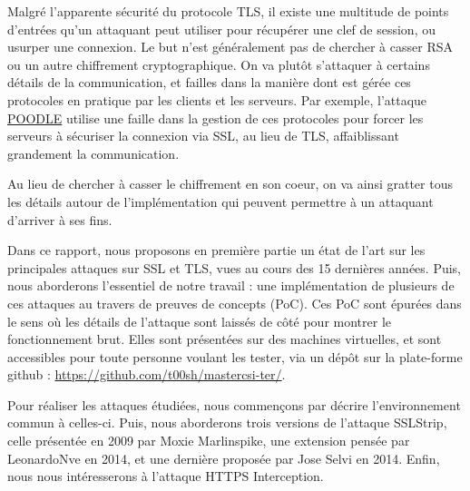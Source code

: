 Malgré l'apparente sécurité du protocole TLS, il existe une multitude de points d'entrées qu'un attaquant peut utiliser pour récupérer une clef de session, ou usurper une connexion. Le but n'est généralement pas de chercher à casser RSA ou un autre chiffrement cryptographique. On va plutôt s'attaquer à certains détails de la communication, et failles dans la manière dont est gérée ces protocoles en pratique par les clients et les serveurs. Par exemple, l'attaque \hyperref[sec:poodle]{POODLE} utilise une faille dans la gestion de ces protocoles pour forcer les serveurs à sécuriser la connexion via SSL, au lieu de TLS, affaiblissant grandement la communication.

Au lieu de chercher à casser le chiffrement en son coeur, on va ainsi gratter tous les détails autour de l'implémentation qui peuvent permettre à un attaquant d'arriver à ses fins.

Dans ce rapport, nous proposons en première partie un état de l'art sur les principales attaques sur SSL et TLS, vues au cours des 15 dernières années. Puis, nous aborderons l'essentiel de notre travail : une implémentation de plusieurs de ces attaques au travers de preuves de concepts (PoC). Ces PoC sont épurées dans le sens où les détails de l'attaque sont laissés de côté pour montrer le fonctionnement brut. Elles sont présentées sur des machines virtuelles, et sont accessibles pour toute personne voulant les tester, via un dépôt sur la plate-forme github : \url{https://github.com/t00sh/mastercsi-ter/}.


Pour réaliser les attaques étudiées, nous commençons par décrire l'environnement commun à celles-ci. Puis, nous aborderons trois versions de l'attaque SSLStrip, celle présentée en 2009 par Moxie Marlinspike, une extension pensée par LeonardoNve en 2014, et une dernière proposée par Jose Selvi en 2014. Enfin, nous nous intéresserons à l'attaque HTTPS Interception.
